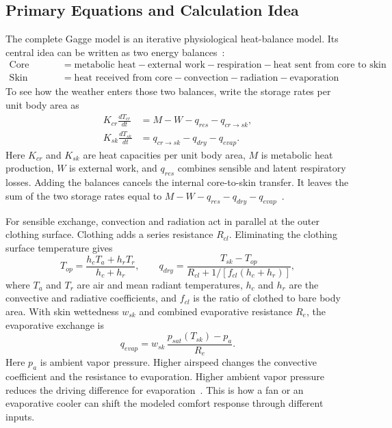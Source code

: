 \subsection{Primary Equations and Calculation Idea}
 
The complete Gagge model is an iterative physiological heat-balance model. Its central idea can be written as two energy balances~\cite{cbe_two_node}:
\begin{align}
\text{Core storage} &= \text{metabolic heat} - \text{external work} - \text{respiration} - \text{heat sent from core to skin} \\
\text{Skin storage} &= \text{heat received from core} - \text{convection} - \text{radiation} - \text{evaporation}
\end{align}
To see how the weather enters those two balances, write the storage rates per unit body area as
\begin{align}
K_{cr}\frac{dT_{cr}}{dt}
 &= M-W-q_{res}-q_{cr\to sk},\\
K_{sk}\frac{dT_{sk}}{dt}
 &= q_{cr\to sk}-q_{dry}-q_{evap}.
\end{align}
Here $K_{cr}$ and $K_{sk}$ are heat capacities per unit body area, $M$ is metabolic heat production, $W$ is external work, and $q_{res}$ combines sensible and latent respiratory losses. Adding the balances cancels the internal core-to-skin transfer. It leaves the sum of the two storage rates equal to $M-W-q_{res}-q_{dry}-q_{evap}$~\cite{ashrae_thermal_comfort_2025}.

For sensible exchange, convection and radiation act in parallel at the outer clothing surface. Clothing adds a series resistance $R_{cl}$. Eliminating the clothing surface temperature gives
\begin{equation}
 T_{op}=\frac{h_c T_a+h_r T_r}{h_c+h_r},
 \qquad
 q_{dry}=\frac{T_{sk}-T_{op}}{R_{cl}+1/[f_{cl}(h_c+h_r)]},
\end{equation}
where $T_a$ and $T_r$ are air and mean radiant temperatures, $h_c$ and $h_r$ are the convective and radiative coefficients, and $f_{cl}$ is the ratio of clothed to bare body area. With skin wettedness $w_{sk}$ and combined evaporative resistance $R_e$, the evaporative exchange is
\begin{equation}
 q_{evap}=w_{sk}\,\frac{p_{sat}(T_{sk})-p_a}{R_e}.
\end{equation}
Here $p_a$ is ambient vapor pressure. Higher airspeed changes the convective coefficient and the resistance to evaporation. Higher ambient vapor pressure reduces the driving difference for evaporation~\cite{ashrae_thermal_comfort_2025}. This is how a fan or an evaporative cooler can shift the modeled comfort response through different inputs.

